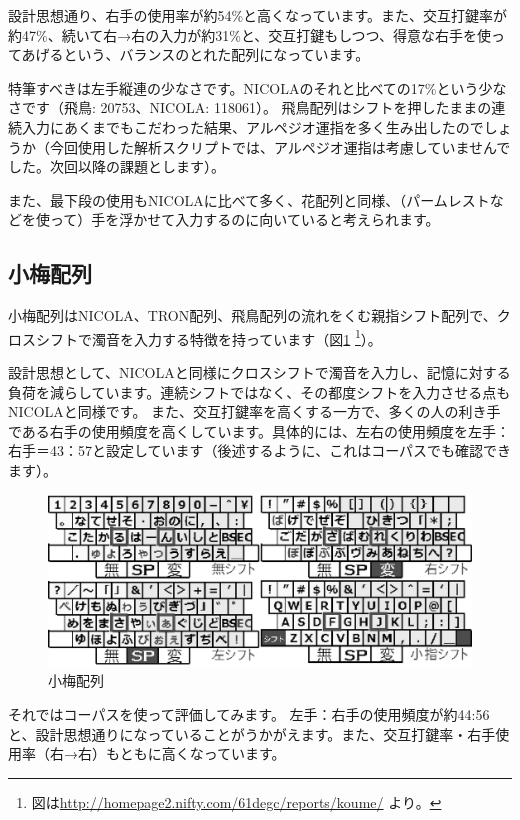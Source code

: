 設計思想通り、右手の使用率が約54\%と高くなっています。また、交互打鍵率が約47\%、続いて右→右の入力が約31\%と、交互打鍵もしつつ、得意な右手を使ってあげるという、バランスのとれた配列になっています。

特筆すべきは左手縦連の少なさです。NICOLAのそれと比べての17\%という少なさです（飛鳥: 20753、NICOLA: 118061）。
飛鳥配列はシフトを押したままの連続入力にあくまでもこだわった結果、アルペジオ運指を多く生み出したのでしょうか（今回使用した解析スクリプトでは、アルペジオ運指は考慮していませんでした。次回以降の課題とします）。

また、最下段の使用もNICOLAに比べて多く、花配列と同様、（パームレストなどを使って）手を浮かせて入力するのに向いていると考えられます。

\subsection*{小梅配列}

小梅配列はNICOLA、TRON配列、飛鳥配列の流れをくむ親指シフト配列で、クロスシフトで濁音を入力する特徴を持っています（図\ref{fig:koume}%
\footnote{図は\url{http://homepage2.nifty.com/61degc/reports/koume/} より。}）。

設計思想として、NICOLAと同様にクロスシフトで濁音を入力し、記憶に対する負荷を減らしています。連続シフトではなく、その都度シフトを入力させる点もNICOLAと同様です。
また、交互打鍵率を高くする一方で、多くの人の利き手である右手の使用頻度を高くしています。具体的には、左右の使用頻度を左手：右手＝43：57と設定しています（後述するように、これはコーパスでも確認できます）。

\begin{figure}[htbp]
 \begin{center}
  \includegraphics[width=0.8\hsize]{koume.eps}
 \end{center}
 \caption{小梅配列}
 \label{fig:koume}
\end{figure}

それではコーパスを使って評価してみます。%
左手：右手の使用頻度が約44:56と、設計思想通りになっていることがうかがえます。また、交互打鍵率・右手使用率（右→右）もともに高くなっています。

